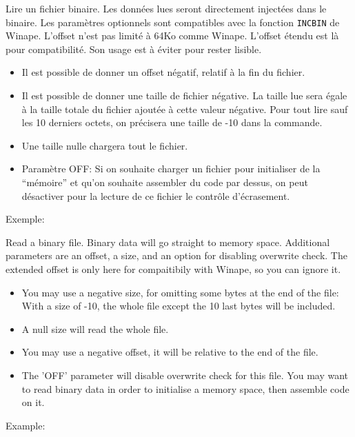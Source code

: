 \begin{xfr}
Lire un fichier binaire. Les données lues seront directement injectées dans le binaire. Les paramètres optionnels sont compatibles avec la fonction \texttt{INCBIN} de Winape. L'offset n'est pas limité à 64Ko comme Winape. L'offset étendu est là pour compatibilité. Son usage est à éviter pour rester lisible.

\begin{itemize}
\item Il est possible de donner un offset négatif, relatif à la fin du fichier.
\item Il est possible de donner une taille de fichier négative. La taille lue sera égale à la taille totale du fichier ajoutée à cette valeur négative. Pour tout lire sauf les 10 derniers octets, on précisera une taille de -10 dans la commande.
\item Une taille nulle chargera tout le fichier.
\item  Paramètre OFF: Si on souhaite charger un fichier pour initialiser de la “mémoire” et qu'on souhaite assembler du code par dessus, on peut désactiver pour la lecture de ce fichier le contrôle d'écrasement.
\end{itemize}
Exemple:
\end{xfr}

\begin{xen}

Read a binary file. Binary data will go straight to memory space. Additional parameters are an offset, a size, and an option for disabling overwrite check. The extended offset is only here for compaitibily with Winape, so you can ignore it.
\begin{itemize}
\item You may use a negative size, for omitting some bytes at the end of the file: With a size of -10, the whole file except the 10 last bytes will be included.
\item A null size will read the whole file.
\item You may use a negative offset, it will be relative to the end of the file.
\item The 'OFF' parameter will disable overwrite check for this file.
You may want to read binary data in order to initialise a memory space, then assemble code on it.
\end{itemize}
Example:
\end{xen}

